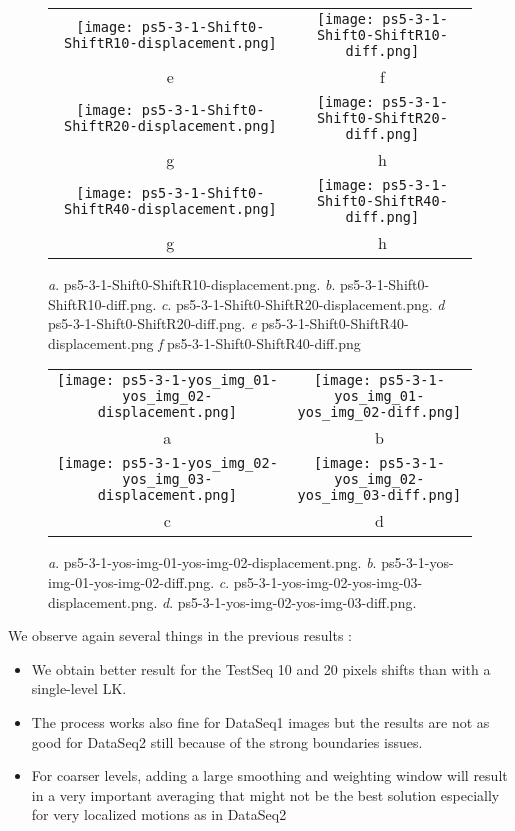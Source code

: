 \documentclass[a4paper,11pt]{article}
\begin{document}
\begin{figure}[H]
\begin{center}
\begin{tabular}{cc}
	\texttt{[image: ps5-3-1-Shift0-ShiftR10-displacement.png]}&
	\texttt{[image: ps5-3-1-Shift0-ShiftR10-diff.png]}\\
	e&f\\
	\texttt{[image: ps5-3-1-Shift0-ShiftR20-displacement.png]}&
	\texttt{[image: ps5-3-1-Shift0-ShiftR20-diff.png]}\\
	g&h\\
	\texttt{[image: ps5-3-1-Shift0-ShiftR40-displacement.png]}&
	\texttt{[image: ps5-3-1-Shift0-ShiftR40-diff.png]}\\
	g&h
\end{tabular}
\end{center}
\caption{ 
\textit{a}. ps5-3-1-Shift0-ShiftR10-displacement.png.  \textit{b}. ps5-3-1-Shift0-ShiftR10-diff.png. \textit{c}. ps5-3-1-Shift0-ShiftR20-displacement.png.  \textit{d} ps5-3-1-Shift0-ShiftR20-diff.png.  \textit{e} ps5-3-1-Shift0-ShiftR40-displacement.png \textit{f} ps5-3-1-Shift0-ShiftR40-diff.png}
\label{ps-5-6-b}
\end{figure}


\begin{figure}[H]
\begin{center}
\begin{tabular}{cc}
	\texttt{[image: ps5-3-1-yos\_img\_01-yos\_img\_02-displacement.png]}&
	\texttt{[image: ps5-3-1-yos\_img\_01-yos\_img\_02-diff.png]}\\
	a&b\\
	\texttt{[image: ps5-3-1-yos\_img\_02-yos\_img\_03-displacement.png]}&
	\texttt{[image: ps5-3-1-yos\_img\_02-yos\_img\_03-diff.png]}\\
	c&d
\end{tabular}
\end{center}
\caption{ 
\textit{a}. ps5-3-1-yos-img-01-yos-img-02-displacement.png.  \textit{b}. ps5-3-1-yos-img-01-yos-img-02-diff.png. \textit{c}. ps5-3-1-yos-img-02-yos-img-03-displacement.png.  \textit{d}. ps5-3-1-yos-img-02-yos-img-03-diff.png. }
\label{ps-5-6-c}
\end{figure}

We observe again several things in the previous results : 
\begin{itemize}
\item We obtain better result for the TestSeq 10 and 20 pixels shifts than with a single-level LK.
\item The process works also fine for DataSeq1 images but the results are not as good for DataSeq2 still because of the strong boundaries issues.
\item For coarser levels, adding a large smoothing and weighting window will result in a very important averaging that might not be the best solution especially for very localized motions as in DataSeq2
\end{itemize}
\end{document}
